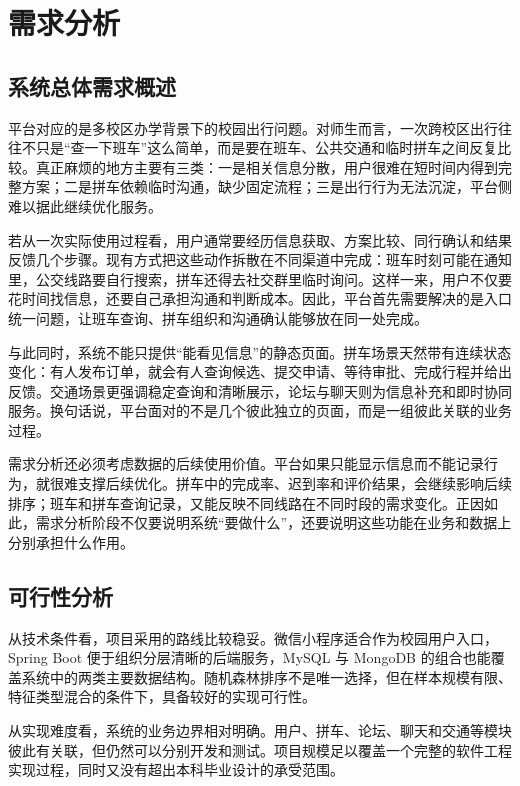 ﻿\chapter{需求分析}\label{chap:requirement}

\section{系统总体需求概述}

平台对应的是多校区办学背景下的校园出行问题。对师生而言，一次跨校区出行往往不只是“查一下班车”这么简单，而是要在班车、公共交通和临时拼车之间反复比较。真正麻烦的地方主要有三类：一是相关信息分散，用户很难在短时间内得到完整方案；二是拼车依赖临时沟通，缺少固定流程；三是出行行为无法沉淀，平台侧难以据此继续优化服务。

若从一次实际使用过程看，用户通常要经历信息获取、方案比较、同行确认和结果反馈几个步骤。现有方式把这些动作拆散在不同渠道中完成：班车时刻可能在通知里，公交线路要自行搜索，拼车还得去社交群里临时询问。这样一来，用户不仅要花时间找信息，还要自己承担沟通和判断成本。因此，平台首先需要解决的是入口统一问题，让班车查询、拼车组织和沟通确认能够放在同一处完成。

与此同时，系统不能只提供“能看见信息”的静态页面。拼车场景天然带有连续状态变化：有人发布订单，就会有人查询候选、提交申请、等待审批、完成行程并给出反馈。交通场景更强调稳定查询和清晰展示，论坛与聊天则为信息补充和即时协同服务。换句话说，平台面对的不是几个彼此独立的页面，而是一组彼此关联的业务过程。

需求分析还必须考虑数据的后续使用价值。平台如果只能显示信息而不能记录行为，就很难支撑后续优化。拼车中的完成率、迟到率和评价结果，会继续影响后续排序；班车和拼车查询记录，又能反映不同线路在不同时段的需求变化。正因如此，需求分析阶段不仅要说明系统“要做什么”，还要说明这些功能在业务和数据上分别承担什么作用。

\section{可行性分析}

从技术条件看，项目采用的路线比较稳妥。微信小程序适合作为校园用户入口，Spring Boot 便于组织分层清晰的后端服务，MySQL 与 MongoDB 的组合也能覆盖系统中的两类主要数据结构。随机森林排序不是唯一选择，但在样本规模有限、特征类型混合的条件下，具备较好的实现可行性。

从实现难度看，系统的业务边界相对明确。用户、拼车、论坛、聊天和交通等模块彼此有关联，但仍然可以分别开发和测试。项目规模足以覆盖一个完整的软件工程实现过程，同时又没有超出本科毕业设计的承受范围。

